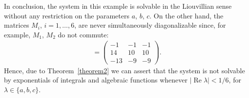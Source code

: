 \documentclass[pdftex]{sigma}
\numberwithin{equation}{section}
\begin{document}
\begin{Example}
In conclusion, the system in this example is solvable in the Liouvillian sense without any restriction on the parameters $a$, $b$, $c$. On the other hand, the matrices $M_i$, $i=1,\dots,6$, are never simultaneously diagonalizable since, for example, $M_1$, $M_2$ do not commute:
\begin{gather*} [M_1,M_2]=\left( \begin{matrix} -1&-1&-1\\ 14&10&10
\\ -13&-9&-9\end{matrix} \right). \end{gather*}
Hence, due to Theorem~\ref{theorem2} we can assert that the system is not solvable by exponentials of integrals and algebraic functions whenever $|\operatorname{Re}\lambda|<1/6$, for $\lambda\in\{a,b,c\}$.
\end{Example}
\end{document}
